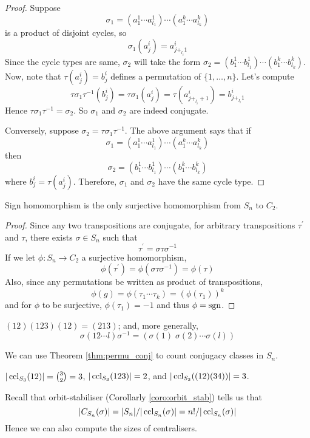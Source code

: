 \documentclass[10pt, a4paper, twoside]{report}
\begin{document}
\begin{proof}
    Suppose \[\sigma_1=(a_1^1\cdots a_{l_1}^1)\cdots(a_1^k\cdots a_{l_k}^k)\] is a product of disjoint cycles, so \[\sigma_1(a_j^i)=a_{j+_{l_i}1}^i\] Since the cycle types are same, \(\sigma_2\) will take the form \(\sigma_2=(b_1^1\cdots b_{l_1}^1)\cdots(b_1^k\cdots b_{l_k}^k)\). Now, note that \(\tau(a_j^i)=b_j^i\) defines a permutation of \(\{1,\ldots,n\}\). Let's compute 
    \[\tau\sigma_1\tau^{-1}(b_j^i)=\tau\sigma_1(a_j^i)=\tau(a_{j+_{l_i}+1}^i)=b_{j+_{l_i}1}^i\]
    Hence \(\tau\sigma_1\tau^{-1}=\sigma_2\). So \(\sigma_1\) and \(\sigma_2\) are indeed conjugate.

    Conversely, suppose \(\sigma_2=\tau\sigma_1\tau^{-1}\). The above argument says that if \[\sigma_1=(a_1^1\cdots a_{l_1}^1)\cdots(a_1^k\cdots a_{l_k}^k)\] then 
    \[\sigma_2=(b_1^1\cdots b_{l_1}^1)\cdots(b_1^k\cdots b_{l_k}^k)\]
    where \(b_j^i=\tau(a_j^i)\). Therefore, \(\sigma_1\) and \(\sigma_2\) have the same cycle type.
\end{proof}
\begin{proposition}
    Sign homomorphism is the only surjective homomorphism from \(S_n\) to \(C_2\). 
\end{proposition}
\begin{proof}
    Since any two transpositions are conjugate, for arbitrary transpositions \(\tau^\prime\) and \(\tau\), there exists \(\sigma\in S_n\) such that 
    \[\tau^\prime=\sigma\tau\sigma^{-1}\]
    If we let \(\phi:S_n\to C_2\) a surjective homomorphism,
    \[\phi(\tau^\prime)=\phi(\sigma\tau\sigma^{-1})=\phi(\tau)\]
    Also, since any permutations be written as product of transpositions,
    \[\phi(g)=\phi(\tau_1\cdots\tau_k)=(\phi(\tau_1))^k\]
    and for \(\phi\) to be surjective, \(\phi(\tau_1)=-1\) and thus \(\phi=\operatorname{sgn}\).
\end{proof}
\begin{example}
    \((12)(123)(12)=(213)\); and, more generally, 
    \[\sigma(12\cdots l)\sigma^{-1}=\left(\sigma(1)\;\sigma(2)\cdots\sigma(l)\right)\]
\end{example}
We can use Theorem \ref{thm:permu_conj} to count conjugacy classes in \(S_n\).
\begin{example}
    \(|\operatorname{ccl}_{S_3}(12)|=\binom 32=3\), \(|\operatorname{ccl}_{S_3}(123)|=2\), and \(|\operatorname{ccl}_{S_3}((12)(34))|=3\).
\end{example}
Recall that orbit-stabiliser (Corollarly \ref{coro:orbit_stab}) tells us that 
\[|C_{S_n}(\sigma)|=|S_n|/|\operatorname{ccl}_{S_n}(\sigma)|=n!/|\operatorname{ccl}_{S_n}(\sigma)|\]
Hence we can also compute the sizes of centralisers.
\end{document}
